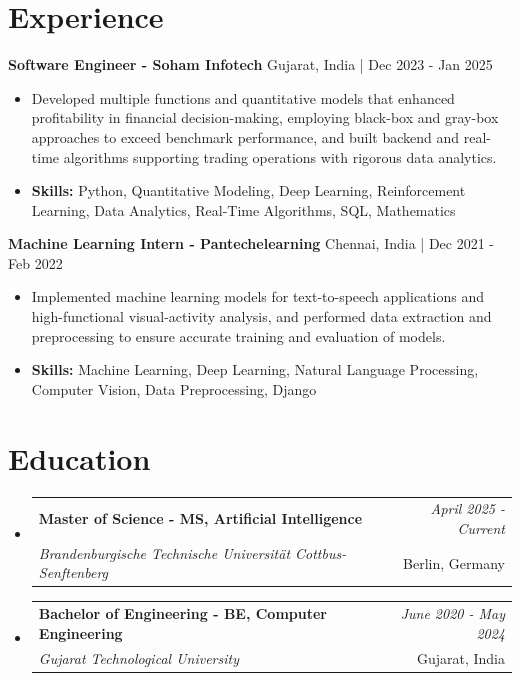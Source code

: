\documentclass[a4paper,11pt]{article}
\makeatletter
\newcommand{\resumeSubheading}[4]{
\vspace{0.5mm}\item
    \begin{tabular*}{\linewidth}[t]{l@{\extracolsep{\fill}}r}
        \textbf{#1} & \textit{\footnotesize{#4}} \\
        \textit{\footnotesize{#3}} &  \footnotesize{#2}\\
    \end{tabular*}
    \vspace{-2.4mm}
}
\makeatother
\begin{document}
\section{\textbf{Experience}}


\vspace{1mm}
  \textbf{Software Engineer - Soham Infotech} \hfill Gujarat, India | Dec 2023 - Jan 2025
\vspace{-1.5mm} %
\begin{itemize}
  \item Developed multiple functions and quantitative models that enhanced profitability in financial decision-making, employing black-box and gray-box approaches to exceed benchmark performance, and built backend and real-time algorithms supporting trading operations with rigorous data analytics.

\vspace{-2mm}
  \item \textbf{Skills:} Python, Quantitative Modeling, Deep Learning, Reinforcement Learning, Data Analytics, Real-Time Algorithms, SQL, Mathematics
\end{itemize}

\vspace{1mm}
  \textbf{Machine Learning Intern - Pantechelearning} \hfill Chennai, India | Dec 2021 - Feb 2022
\vspace{-1.5mm} %
\begin{itemize}
  \item Implemented machine learning models for text-to-speech applications and high-functional visual-activity analysis, and performed data extraction and preprocessing to ensure accurate training and evaluation of models.
\vspace{-2mm}
  \item \textbf{Skills:} Machine Learning, Deep Learning, Natural Language Processing, Computer Vision, Data Preprocessing, Django
\end{itemize}\section{\textbf{Education}}
\vspace{-0.4mm}

\begin{itemize}[leftmargin=0.15in, label={}]
\resumeSubheading
{Master of Science - MS, Artificial Intelligence }{Berlin, Germany}
{Brandenburgische Technische Universität Cottbus-Senftenberg  }{April 2025 - Current}

\vspace{1.0mm} %
\resumeSubheading
{Bachelor of Engineering - BE, Computer Engineering  }{Gujarat, India}
{Gujarat Technological University }{June 2020 - May 2024}

\end{itemize}
\end{document}
